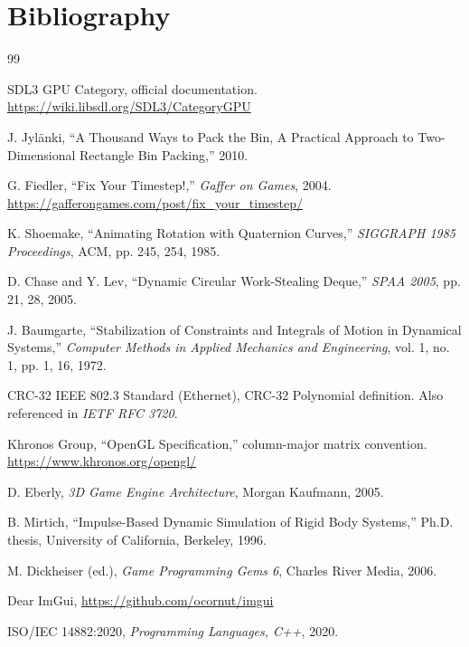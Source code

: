 \chapter*{Bibliography}

\begin{thebibliography}{99}

SDL3 GPU Category, official documentation.
\url{https://wiki.libsdl.org/SDL3/CategoryGPU}

J. Jylänki, ``A Thousand Ways to Pack the Bin, A Practical Approach to Two-Dimensional Rectangle Bin Packing,'' 2010.

G. Fiedler, ``Fix Your Timestep!,'' \emph{Gaffer on Games}, 2004.
\url{https://gafferongames.com/post/fix_your_timestep/}

K. Shoemake, ``Animating Rotation with Quaternion Curves,'' \emph{SIGGRAPH 1985 Proceedings}, ACM, pp. 245, 254, 1985.

D. Chase and Y. Lev, ``Dynamic Circular Work-Stealing Deque,'' \emph{SPAA 2005}, pp. 21, 28, 2005.

J. Baumgarte, ``Stabilization of Constraints and Integrals of Motion in Dynamical Systems,'' \emph{Computer Methods in Applied Mechanics and Engineering}, vol. 1, no. 1, pp. 1, 16, 1972.

CRC-32 IEEE 802.3 Standard (Ethernet), CRC-32 Polynomial definition. Also referenced in \emph{IETF RFC 3720}.

Khronos Group, ``OpenGL Specification,'' column-major matrix convention.
\url{https://www.khronos.org/opengl/}

D. Eberly, \emph{3D Game Engine Architecture}, Morgan Kaufmann, 2005.

B. Mirtich, ``Impulse-Based Dynamic Simulation of Rigid Body Systems,'' Ph.D. thesis, University of California, Berkeley, 1996.

M. Dickheiser (ed.), \emph{Game Programming Gems 6}, Charles River Media, 2006.

Dear ImGui, \url{https://github.com/ocornut/imgui}

ISO/IEC 14882:2020, \emph{Programming Languages, C++}, 2020.

\end{thebibliography}
